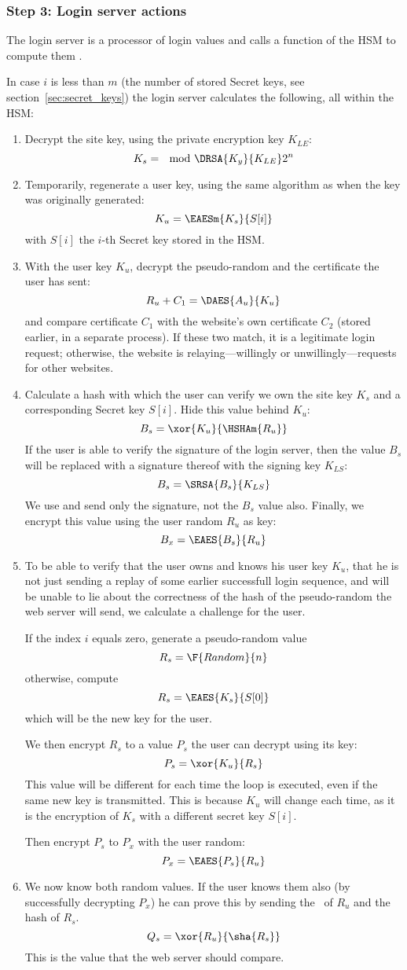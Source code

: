 \subsubsection{Step 3: Login server actions}
\label{sec:login_step3}
The login server is a processor of login values and calls a function of the HSM to compute them
.
\par
In case $i$ is less than $m$
(the number of stored Secret keys, see section~\vref{sec:secret_keys})
the login server calculates the following, all within the HSM:
\begin{enumerate}
\item Decrypt the site key, using the private encryption key $K_{LE}$:
\[K_s=\mod{\DRSA{K_y}{K_{LE}}}{2^n}\]
\item Temporarily, regenerate a user key, using the same algorithm as when the key was originally generated:
\[K_u=\EAESm{K_s}{S[i]}\]
with $S[i]$ the $i$-th Secret key stored in the HSM.
\item With the user key $K_u$, decrypt the pseudo-random and the certificate the user has sent:
\[R_u + C_1=\DAES{A_u}{K_u}\]
and compare certificate $C_1$ with the website's own certificate $C_2$
(stored earlier, in a separate process).
If these two match,
it is a legitimate login request;
otherwise, the website is relaying---willingly or unwillingly---requests for other websites.
\item Calculate a hash with which the user can verify we own the site key $K_s$ and a corresponding Secret key $S[i]$.
Hide this value behind $K_u$:
\[B_s=\xor{K_u}{\HSHAm{R_u}}\]
If the user is able to verify the signature of the login server,
then the value $B_s$ will be replaced with a signature thereof with the signing key $K_{LS}$:
\[B_s=\SRSA{B_s}{K_{LS}}\]
We use and send only the signature, not the $B_s$ value also.
Finally, we encrypt this value using the user random $R_u$ as key:
\[B_x=\EAES{B_s}{R_u}\]
\item To be able to verify that the user owns and knows his user key $K_u$,
that he is not just sending a replay of some earlier successfull login sequence,
and will be unable to lie about the correctness of the hash of the pseudo-random the web server will send,
we calculate a challenge for the user.
\par
If the index $i$ equals zero, generate a pseudo-random value
\[R_s=\F{Random}{n}\]
otherwise, compute
\[R_s=\EAES{K_s}{S[0]}\]
which will be the new key for the user.
\par
We then encrypt $R_s$ to a value $P_s$ the user can decrypt using its key:
\[P_s=\xor{K_u}{R_s}\]
This value will be different for each time the loop is executed,
even if the same new key is transmitted.
This is because $K_u$ will change each time,
as it is the encryption of $K_s$ with a different secret key $S[i]$.
\par
Then encrypt $P_s$ to $P_x$ with the user random:
\[P_x=\EAES{P_s}{R_u}\]
\item We now know both random values.
If the user knows them also
(by successfully decrypting $P_x$)
he can prove this by sending the \XOR\ of $R_u$ and the hash of $R_s$.
\[Q_s=\xor{R_u}{\sha{R_s}}\]
This is the value that the web server should compare.
\end{enumerate}
